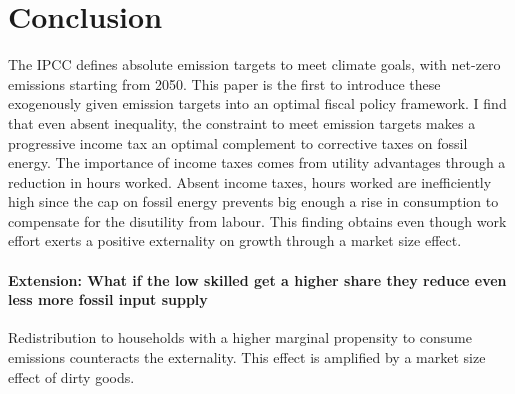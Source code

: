 \section{Conclusion}\label{sec:con}

\begin{comment}
	content...
\tr{In contrast to \cite{Acemoglu2012TheChange}, perceiving dirty output as the source of the externality is misleading in my model: As productivity in this sector rises, so does the externality. Instead, one could think of one input factor to dirty production (i.e. energy) which causes pollution, then a more productive technology can generate more output at a lower externality. \\
Substitutability as the focus of technological advancement: (a) the economy grows as more clean goods can be used to replace dirty goods; this corresponds to less emissions in the final good production. (b) or progress on dirtiness of energy use...CONSULT \cite{Acemoglu2012TheChange} who discuss distinct forms of progress. }

\end{comment}

The IPCC defines absolute emission targets to meet climate goals, with net-zero emissions starting from 2050. This paper is the first to introduce these exogenously given emission targets into an optimal fiscal policy framework. I find that even absent inequality, the constraint to meet emission targets makes a progressive income tax an optimal complement to corrective taxes on fossil energy. 
The importance of income taxes comes from utility advantages through a reduction in hours worked. Absent income taxes, hours worked are inefficiently high since the cap on fossil energy prevents big enough a rise in consumption to compensate for the disutility from labour. 
This finding obtains even though work effort exerts a positive externality on growth through a market size effect. 

\paragraph{Extension: What if the low skilled get a higher share \ar they reduce even less \ar more fossil input supply}

Redistribution to households with a higher marginal propensity to consume emissions counteracts the externality. This effect is amplified by a market size effect  of dirty goods. 


